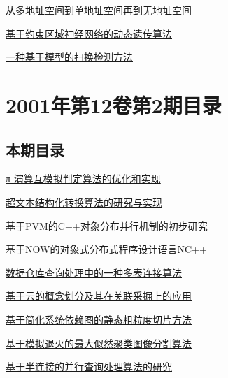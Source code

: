\documentclass[a4paper]{article}
\begin{document}
\href{http://www.jos.org.cn/ch/reader/download_pdf.aspx?file_no=20010321&year_id=2001&quarter_id=3&falg=1}{从多地址空间到单地址空间再到无地址空间}

\href{http://www.jos.org.cn/ch/reader/download_pdf.aspx?file_no=20010322&year_id=2001&quarter_id=3&falg=1}{基于约束区域神经网络的动态遗传算法}

\href{http://www.jos.org.cn/ch/reader/download_pdf.aspx?file_no=20010323&year_id=2001&quarter_id=3&falg=1}{一种基于模型的扫换检测方法}


\section{\textbf{2001年第12卷第2期目录}}
\subsection{本期目录}
\href{http://www.jos.org.cn/ch/reader/download_pdf.aspx?file_no=20010201&year_id=2001&quarter_id=2&falg=1}{π-演算互模拟判定算法的优化和实现}

\href{http://www.jos.org.cn/ch/reader/download_pdf.aspx?file_no=20010202&year_id=2001&quarter_id=2&falg=1}{超文本结构化转换算法的研究与实现}

\href{http://www.jos.org.cn/ch/reader/download_pdf.aspx?file_no=20010203&year_id=2001&quarter_id=2&falg=1}{基于PVM的C++对象分布并行机制的初步研究}

\href{http://www.jos.org.cn/ch/reader/download_pdf.aspx?file_no=20010204&year_id=2001&quarter_id=2&falg=1}{基于NOW的对象式分布式程序设计语言NC++}

\href{http://www.jos.org.cn/ch/reader/download_pdf.aspx?file_no=20010205&year_id=2001&quarter_id=2&falg=1}{数据仓库查询处理中的一种多表连接算法}

\href{http://www.jos.org.cn/ch/reader/download_pdf.aspx?file_no=20010206&year_id=2001&quarter_id=2&falg=1}{基于云的概念划分及其在关联采掘上的应用}

\href{http://www.jos.org.cn/ch/reader/download_pdf.aspx?file_no=20010207&year_id=2001&quarter_id=2&falg=1}{基于简化系统依赖图的静态粗粒度切片方法}

\href{http://www.jos.org.cn/ch/reader/download_pdf.aspx?file_no=20010208&year_id=2001&quarter_id=2&falg=1}{基于模拟退火的最大似然聚类图像分割算法}

\href{http://www.jos.org.cn/ch/reader/download_pdf.aspx?file_no=20010209&year_id=2001&quarter_id=2&falg=1}{基于半连接的并行查询处理算法的研究}
\end{document}
